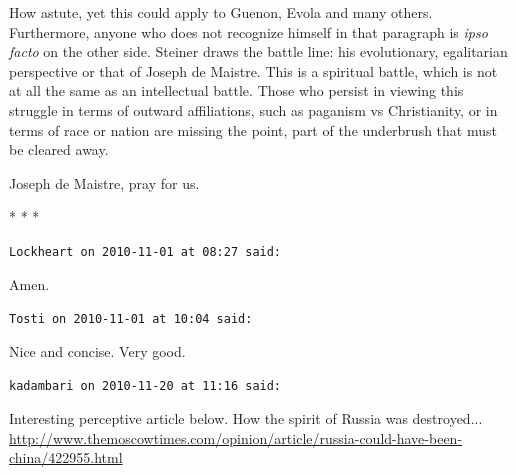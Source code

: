 How astute, yet this could apply to Guenon, Evola and many others. Furthermore, anyone who does not recognize himself in that paragraph is \emph{ipso facto} on the other side. Steiner draws the battle line: his evolutionary, egalitarian perspective or that of Joseph de Maistre. This is a spiritual battle, which is not at all the same as an intellectual battle. Those who persist in viewing this struggle in terms of outward affiliations, such as paganism vs Christianity, or in terms of race or nation are missing the point, part of the underbrush that must be cleared away.

Joseph de Maistre, pray for us.



\begin{center}* * *\end{center}

\begin{footnotesize}
\begin{sffamily}
\texttt{Lockheart on 2010-11-01 at 08:27 said:}

Amen.

\hfill

\texttt{Tosti on 2010-11-01 at 10:04 said:}

Nice and concise. Very good.

\hfill

\texttt{kadambari on 2010-11-20 at 11:16 said:}

Interesting perceptive article below. How the spirit of Russia was destroyed... \url{http://www.themoscowtimes.com/opinion/article/russia-could-have-been-china/422955.html}



\hfill

\end{sffamily}
\end{footnotesize}

